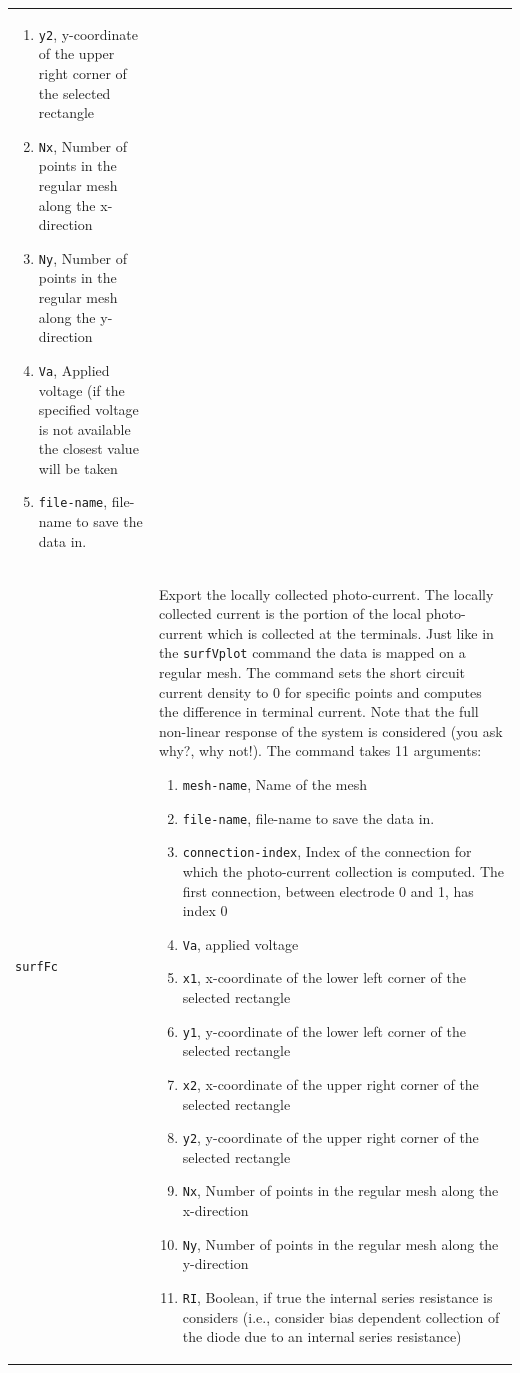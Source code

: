 \documentclass[noshowpacs,preprintnumbers,amsmath,amssymb, letter]{revtex4}
\begin{document}
\begin{longtable}{p{}p{}}
\begin{enumerate}
\item \texttt{y2}, y-coordinate of the upper right corner of the selected rectangle
\item \texttt{Nx}, Number of points in the regular mesh along the x-direction
\item \texttt{Ny}, Number of points in the regular mesh along the y-direction
\item \texttt{Va}, Applied voltage (if the specified voltage is not available the closest value will be taken
\item \texttt{file-name}, file-name to save the data in.
\end{enumerate}\\
\texttt{surfFc}		& Export the locally collected photo-current. The locally collected current is the portion of the local photo-current which is collected at the terminals. Just like in the \texttt{surfVplot} command the data is mapped on a regular mesh. The command sets the short circuit current density to 0 for specific points and computes the difference in terminal current. Note that the full non-linear response of the system is considered (you ask why?, why not!). The command takes 11 arguments:
\begin{enumerate}
\item \texttt{mesh-name}, Name of the mesh
\item \texttt{file-name}, file-name to save the data in.
\item \texttt{connection-index}, Index of the connection for which the photo-current collection is computed. The first connection, between electrode 0 and 1,  has index 0
\item \texttt{Va}, applied voltage
\item \texttt{x1}, x-coordinate of the lower left corner of the selected rectangle
\item \texttt{y1}, y-coordinate of the lower left corner of the selected rectangle
\item \texttt{x2}, x-coordinate of the upper right corner of the selected rectangle
\item \texttt{y2}, y-coordinate of the upper right corner of the selected rectangle
\item \texttt{Nx}, Number of points in the regular mesh along the x-direction
\item \texttt{Ny}, Number of points in the regular mesh along the y-direction
\item \texttt{RI}, Boolean, if true the internal series resistance is considers (i.e., consider bias dependent collection of the diode due to an internal series resistance)

\end{enumerate}
\end{longtable}
\end{document}
